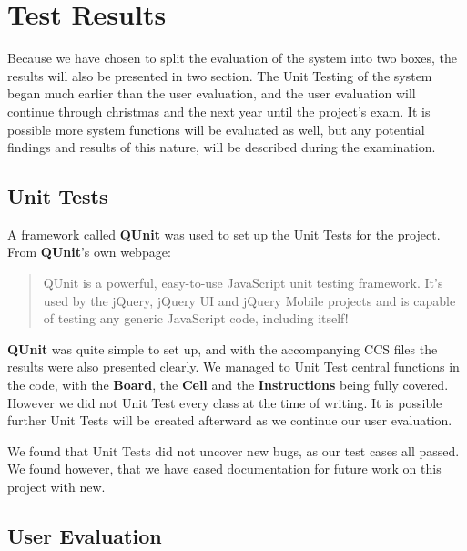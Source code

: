 \section{Test Results}
\label{sec:testresults}

Because we have chosen to split the evaluation of the system into two boxes, the results will also be presented in two section. The Unit Testing of the system began much earlier than the user evaluation, and the user evaluation will continue through christmas and the next year until the project's exam. It is possible more system functions will be evaluated as well, but any potential findings and results of this nature, will be described during the examination.

\subsection{Unit Tests}

A framework called \textbf{QUnit} was used to set up the Unit Tests for the project. From \textbf{QUnit}'s own webpage:

\begin{quotation}
QUnit is a powerful, easy-to-use JavaScript unit testing framework. It's used by the jQuery, jQuery UI and jQuery Mobile projects and is capable of testing any generic JavaScript code, including itself!\cite{qunit}
\end{quotation}

\textbf{QUnit} was quite simple to set up, and with the accompanying CCS files the results were also presented clearly. We managed to Unit Test central functions in the code, with the \textbf{Board}, the \textbf{Cell} and the \textbf{Instructions} being fully covered.  However we did not Unit Test every class at the time of writing. It is possible further Unit Tests will be created afterward as we continue our user evaluation.


We found that Unit Tests did not uncover new bugs, as our test cases all passed. We found however, that we have eased documentation for future work on this project with new.

\subsection{User Evaluation}

